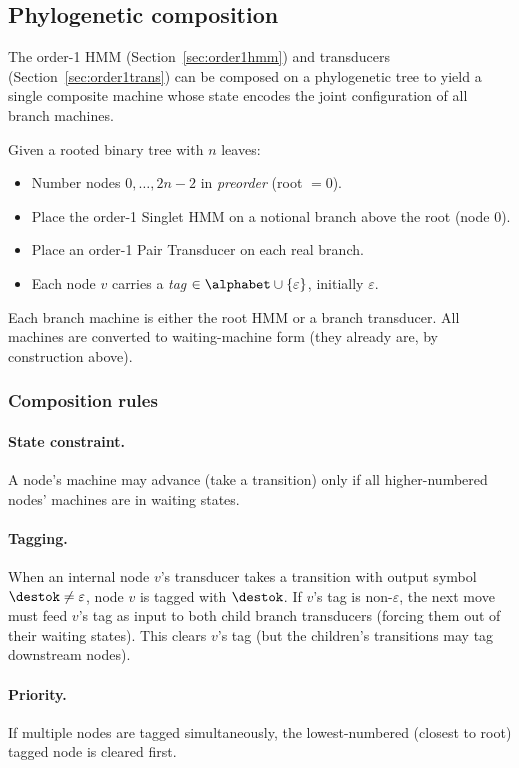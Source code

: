 
\subsection{Phylogenetic composition}
\label{sec:composition}

The order-1 HMM (Section~\ref{sec:order1hmm}) and transducers (Section~\ref{sec:order1trans})
can be composed on a phylogenetic tree to yield a single composite machine
whose state encodes the joint configuration of all branch machines.

Given a rooted binary tree with $n$ leaves:
\begin{itemize}
\item Number nodes $0,\ldots,2n-2$ in \emph{preorder} (root $= 0$).
\item Place the order-1 Singlet HMM on a notional branch above the root (node 0).
\item Place an order-1 Pair Transducer on each real branch.
\item Each node $v$ carries a \emph{tag} $\in \alphabet \cup \{\varepsilon\}$, initially $\varepsilon$.
\end{itemize}

Each branch machine is either the root HMM or a branch transducer.
All machines are converted to waiting-machine form (they already are, by construction above).

\subsubsection{Composition rules}

\paragraph{State constraint.}
A node's machine may advance (take a transition) only if all higher-numbered nodes' machines
are in waiting states.

\paragraph{Tagging.}
When an internal node $v$'s transducer takes a transition with output symbol $\destok \neq \varepsilon$,
node $v$ is tagged with $\destok$.
If $v$'s tag is non-$\varepsilon$, the next move must feed $v$'s tag as input
to both child branch transducers (forcing them out of their waiting states).
This clears $v$'s tag (but the children's transitions may tag downstream nodes).

\paragraph{Priority.}
If multiple nodes are tagged simultaneously,
the lowest-numbered (closest to root) tagged node is cleared first.

